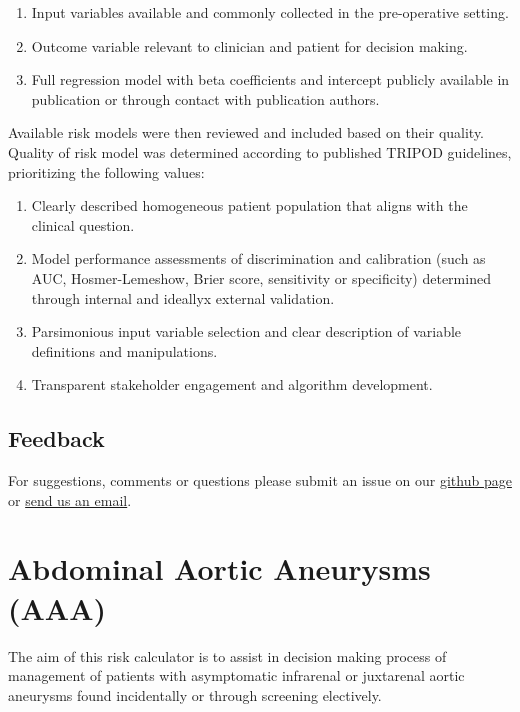 \documentclass[
]{book}
\providecommand{\tightlist}{%
  \setlength{\itemsep}{0pt}\setlength{\parskip}{0pt}}
\begin{document}
\begin{enumerate}
\def\labelenumi{\arabic{enumi}.}
\tightlist
\item
  Input variables available and commonly collected in the pre-operative setting.
\item
  Outcome variable relevant to clinician and patient for decision making.
\item
  Full regression model with beta coefficients and intercept publicly available in publication or through contact with publication authors.
\end{enumerate}

Available risk models were then reviewed and included based on their quality. Quality of risk model was determined according to published TRIPOD guidelines,\citep{collinsTransparentReportingMultivariable2015, moonsTransparentReportingMultivariable2015} prioritizing the following values:

\begin{enumerate}
\def\labelenumi{\arabic{enumi}.}
\tightlist
\item
  Clearly described homogeneous patient population that aligns with the clinical question.
\item
  Model performance assessments of discrimination and calibration (such as AUC, Hosmer-Lemeshow, Brier score, sensitivity or specificity) determined through internal and ideallyx external validation.
\item
  Parsimonious input variable selection and clear description of variable definitions and manipulations.
\item
  Transparent stakeholder engagement and algorithm development.
\end{enumerate}

\hypertarget{feedback}{%
\section{Feedback}\label{feedback}}

For suggestions, comments or questions please submit an issue on our \href{https://github.com/adam-mdmph/vascalc/issues}{github page} or \href{mailto:vascularcalculator@gmail.com}{send us an email}.

\hypertarget{aaa}{%
\chapter{Abdominal Aortic Aneurysms (AAA)}\label{aaa}}

The aim of this risk calculator is to assist in decision making process of management of patients with asymptomatic infrarenal or juxtarenal aortic aneurysms found incidentally or through screening electively.
\end{document}
